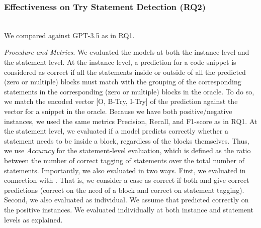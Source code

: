 \subsubsection{Effectiveness on Try Statement Detection (RQ2)}~\\
 We compared {\xstate} against GPT-3.5 as in RQ1.




{\em Procedure and Metrics.} We evaluated the models at both the
instance level and the statement level. At the instance level, a
prediction for a code snippet is considered as correct if all the
statements inside or outside of all the predicted (zero or
multiple)  blocks must match with the grouping of the
corresponding statements in the corresponding (zero or
multiple)  blocks in the oracle. To do so, we match
the encoded vector [O, B-Try, I-Try] of the prediction against the
vector for a snippet in the oracle. Because we have both
positive/negative instances, we used the same metrics Precision,
Recall, and F1-score as in RQ1. At the statement level, we evaluated
if a model predicts correctly whether a statement needs to be inside
a  block, regardless of the blocks themselves. Thus,
we use {\em Accuracy} for the statement-level evaluation, which is
defined as the ratio between the number of correct tagging of
statements over the total number of statements.  Importantly, we also
evaluated {\tool} in two ways. First, we evaluated {\xstate} in
connection with {\xblock}. That is, we consider a case as correct if
both {\xblock} and {\xstate} give correct predictions (correct on the
need of a  block and correct on statement
tagging). Second, we also evaluated {\xstate} as individual. We assume
that {\xblock} predicted correctly on the positive instances. We
evaluated {\xstate} individually at both instance and statement levels
as explained.


